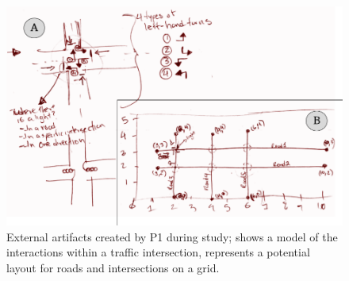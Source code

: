
\begin{figure}
\includegraphics[width=\columnwidth]{figures/P4sketches}
\caption{External artifacts created by P1 during study; \protect{} shows a model of the interactions within a traffic intersection, \protect{} represents a potential layout for roads and intersections on a grid.}
\label{P4Sketch}
\end{figure}


